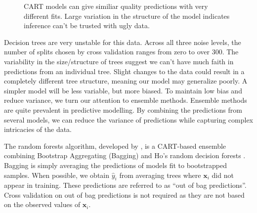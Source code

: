 \documentclass[
  12pt,
  letterpaper,
  DIV=11,
  numbers=noendperiod]{scrartcl}
\newcommand{\bm}{\mathbf}
\begin{document}
\begin{figure}[H]


\caption{\label{fig-sim1-tree}CART models can give similiar quality
predictions with very different fits. Large variation in the structure
of the model indicates inference can't be trusted with ugly data.}

\end{figure}%

Decision trees are very unstable for this data. Across all three noise
levels, the number of splits chosen by cross validation ranges from zero
to over 300. The variability in the size/structure of trees suggest we
can't have much faith in predictions from an individual tree. Slight
changes to the data could result in a completely different tree
structure, meaning our model may generalize poorly. A simpler model will
be less variable, but more biased. To maintain low bias and reduce
variance, we turn our attention to ensemble methods. Ensemble methods
are quite prevalent in predictive modelling. By combining the
predictions from several models, we can reduce the variance of
predictions while capturing complex intricacies of the data.

The random forests algorithm, developed by \cite{random_forest}, is a
CART-based ensemble combining Bootstrap Aggregating (Bagging)
\citep{bagging} and Ho's random decision forests \citep{Ho}. Bagging is
simply averaging the predictions of models fit to bootstrapped samples.
When possible, we obtain \(\hat y_i\) from averaging trees where
\(\bm x_i\) did not appear in training. These predictions are referred
to as ``out of bag predictions''. Cross validation on out of bag
predictions is not required as they are not based on the observed values
of \(\bm x_i\).
\end{document}
